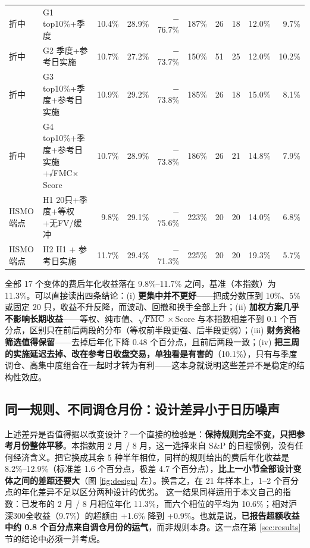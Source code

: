 \documentclass[11pt,a4paper]{article}
\newcommand{\FMC}{\mathrm{FMC}}
\begin{document}
\begin{table}[!htbp]
{\begin{tabular}{@{}llrrrrrrrr@{}}
折中 & G1 top10\%+季度 & 10.4\% & 28.9\% & $-$76.7\% & 187\% & 26 & 18 & 12.0\% & 9.7\% \\
折中 & G2 季度+参考日实施 & 10.7\% & 27.2\% & $-$73.7\% & 150\% & 51 & 25 & 12.0\% & 10.2\% \\
折中 & G3 top10\%+季度+参考日实施 & 10.9\% & 29.2\% & $-$73.8\% & 185\% & 26 & 18 & 15.0\% & 8.1\% \\
折中 & G4 top10\%+季度+参考日实施+√FMC$\times$Score & 10.7\% & 28.9\% & $-$73.8\% & 186\% & 26 & 21 & 14.8\% & 7.9\% \\
HSMO 端点 & H1 20只+季度+等权+无FV/缓冲 & 9.8\% & 29.1\% & $-$75.6\% & 223\% & 20 & 20 & 14.0\% & 6.8\% \\
HSMO 端点 & H2 H1 + 参考日实施 & 11.7\% & 29.4\% & $-$71.3\% & 225\% & 20 & 20 & 19.3\% & 5.7\% \\
\bottomrule
\end{tabular}
}
\end{table}

全部 17 个变体的费后年化收益落在 9.8\%--11.7\% 之间，基准（本指数）为 11.3\%。可以直接读出四条结论：(i) \textbf{更集中并不更好}——把成分数压到 10\%、5\% 或固定 20 只，收益不升反降，而波动、回撤和换手全部上升；(ii) \textbf{加权方案几乎不影响长期收益}——等权、纯市值、$\sqrt{\FMC}\times$Score 与本指数相差不到 0.1 个百分点，区别只在前后两段的分布（等权前半段更强、后半段更弱）；(iii) \textbf{财务资格筛选值得保留}——去掉后年化下降 0.48 个百分点，且前后两段一致；(iv) \textbf{把三周的实施延迟去掉、改在参考日收盘交易，单独看是有害的}（10.1\%），只有与季度调仓、高集中度组合在一起时才转为有利——这本身就说明这些差异不是稳定的结构性效应。
\FloatBarrier
\subsection{同一规则、不同调仓月份：设计差异小于日历噪声}
上述差异是否值得据以改变设计？一个直接的检验是：\textbf{保持规则完全不变，只把参考月份整体平移}。本指数用 2 月 / 8 月，这一选择来自 S\&P 的日程惯例，没有任何经济含义。把它换成其余 5 种半年相位，同样的规则给出的费后年化收益是 8.2\%--12.9\%（标准差 1.6 个百分点，极差 4.7 个百分点），\textbf{比上一小节全部设计变体之间的差距还要大}（图 \ref{fig:design} 左）。换言之，在 21 年样本上，1--2 个百分点的年化差异不足以区分两种设计的优劣。
这一结果同样适用于本文自己的指数：已发布的 2 月 / 8 月相位年化 11.3\%，而六个相位的平均为 10.6\%；相对沪深300全收益（9.7\%）的超额由 +1.6\% 降到 +0.9\%。也就是说，\textbf{已报告超额收益中约 0.8 个百分点来自调仓月份的运气}，而非规则本身。这一点在第 \ref{sec:results} 节的结论中必须一并考虑。
\FloatBarrier
\end{document}
